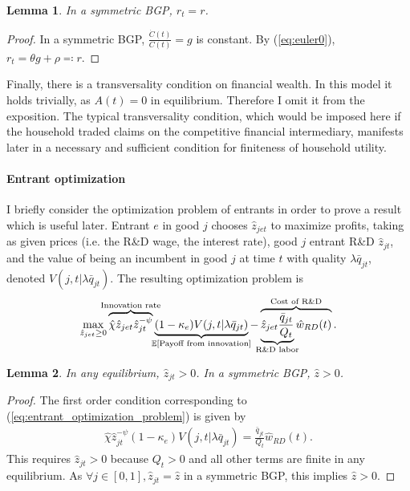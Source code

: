 \documentclass[11pt,english]{article}
\newtheorem{lemma}{Lemma}
\theoremstyle{definition}
\begin{document}
\begin{lemma}\label{lemma:constant_interest_rate}
	In a symmetric BGP, $r_t = r$.
\end{lemma}

\begin{proof}
	In a symmetric BGP, $\frac{\dot{C}(t)}{C(t)} = g$ is constant. By (\ref{eq:euler0}), $r_t = \theta g + \rho \eqqcolon r$.
\end{proof}

Finally, there is a transversality condition on financial wealth. In this model it holds trivially, as $A(t) = 0$ in equilibrium. Therefore I omit it from the exposition. The typical transversality condition, which would be imposed here if the household traded claims on the competitive financial intermediary, manifests later in a necessary and sufficient condition for finiteness of household utility.

\paragraph{Entrant optimization}

I briefly consider the optimization problem of entrants in order to prove a result which is useful later. Entrant $e$ in good $j$ chooses $\hat{z}_{jet}$ to maximize profits, taking as given prices (i.e. the R\&D wage, the interest rate), good $j$ entrant R\&D $\hat{z}_{jt}$, and the value of being an incumbent in good $j$ at time $t$ with quality $\lambda \bar{q}_{jt}$, denoted $V(j,t|\lambda \bar{q}_{jt})$. The resulting optimization problem is
\begin{align}
	\max_{\hat{z}_{jet} \ge 0} \overbrace{\hat{\chi} \hat{z}_{jet} \hat{z}_{jt}^{-\psi}}^{\mathclap{\text{Innovation rate}}} \underbrace{(1-\kappa_e) V(j,t|\lambda \bar{q}_{jt})}_{\mathclap{\mathbb{E}[\text{Payoff from innovation}]}} -  \overbrace{\underbrace{\hat{z}_{jet} \frac{\bar{q}_{jt}}{Q_t}}_{\mathclap{\text{R\&D labor}}} \hat{w}_{RD}(t)}^{\mathclap{\text{Cost of R\&D}}}. \label{eq:entrant_optimization_problem}
\end{align}

\begin{lemma}
	In any equilibrium, $\hat{z}_{jt} > 0$. In a symmetric BGP, $\hat{z} > 0$.  
\end{lemma} 

\begin{proof}	
	The first order condition corresponding to (\ref{eq:entrant_optimization_problem}) is given by
	\begin{align*}
		\hat{\chi} \hat{z}_{jt}^{-\psi} (1-\kappa_e) V(j,t|\lambda \bar{q}_{jt}) = \frac{\bar{q}_{jt}}{Q_t} \hat{w}_{RD}(t).
	\end{align*}
	This requires $\hat{z}_{jt} > 0$ because $Q_t > 0$ and all other terms are finite in any equilibrium. As $\forall j \in [0,1], \hat{z}_{jt} = \hat{z}$ in a symmetric BGP, this implies $\hat{z} > 0$.  
\end{proof}
\end{document}
